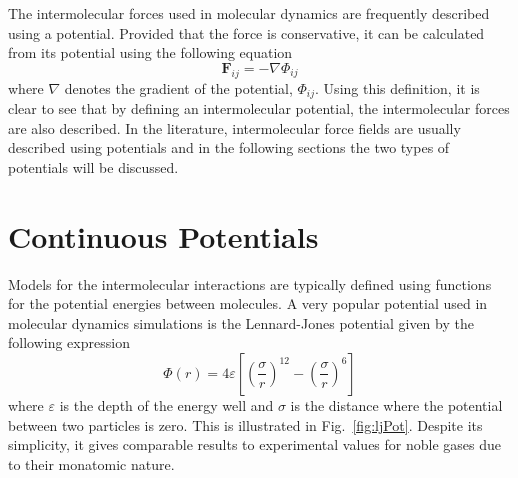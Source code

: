 \documentclass[12pt]{UoAthesis}
\begin{document}
%

The intermolecular forces used in molecular dynamics are frequently
described using a potential.  Provided that the force is conservative,
it can be calculated from its potential using the following equation
\begin{equation} 
  \mathbf{F}_{ij}=-\nabla \Phi_{ij}
  \label{eq:forcePotential} 
\end{equation}
%
%
where $\nabla$ denotes the gradient of the potential,
$\Phi_{ij}$. Using this definition, it is clear to see that by
defining an intermolecular potential, the intermolecular forces are
also described.  In the literature, intermolecular force fields are
usually described using potentials and in the following sections the
two types of potentials will be discussed.

\section{Continuous Potentials}
Models for the intermolecular interactions are typically defined using
functions for the potential energies between molecules.  A very
popular potential used in molecular dynamics simulations is the
Lennard-Jones potential \cite{Lennard-Jones1924} given by the
following expression
\begin{equation} 
  \Phi(r) = 4 \varepsilon \left[ \left( \frac{\sigma}{r} \right)^{12}
    -\left( \frac{\sigma}{r} \right)^{6} \right] 
  \label{eq:LJ} 
\end{equation}
%
%
where $\varepsilon$ is the depth of the energy well and $\sigma$ is
the distance where the potential between two particles is zero. This
is illustrated in Fig.~\ref{fig:ljPot}. Despite its simplicity, it
gives comparable results to experimental values \cite{Rahman1964} for
noble gases due to their monatomic nature.
\end{document}
